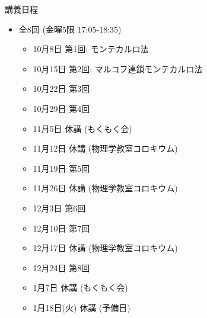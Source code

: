 \begin{frame}[t]{講義日程}
  \begin{itemize}
  \item 全8回 (金曜5限 {\color{red}17:05}-18:35)
    \begin{itemize}
    \item 10月8日 第1回: モンテカルロ法
    \item 10月15日 第2回: マルコフ連鎖モンテカルロ法
    \item 10月22日 第3回
    \item 10月29日 第4回
    \item 11月5日 休講 (もくもく会)
    \item 11月12日 休講 (物理学教室コロキウム)
    \item 11月19日 第5回
    \item 11月26日 休講 (物理学教室コロキウム)
    \item 12月3日 第6回
    \item 12月10日 第7回
    \item 12月17日 休講 (物理学教室コロキウム)
    \item 12月24日 第8回
    \item 1月7日 休講 (もくもく会)
    \item 1月18日(火) 休講 (予備日)
    \end{itemize}
  \end{itemize}
\end{frame}

